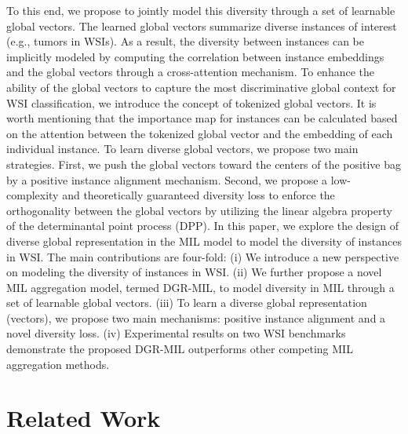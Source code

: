 \documentclass[runningheads]{llncs}
\begin{document}
\indent To this end, we propose to jointly model this diversity through a set of learnable global vectors. The learned global vectors summarize diverse instances of interest (e.g., tumors in WSIs). As a result, the diversity between instances can be implicitly modeled by computing the correlation between instance embeddings and the global vectors through a cross-attention mechanism. To enhance the ability of the global vectors to capture the most discriminative global context for WSI classification, we introduce the concept of tokenized global vectors. It is worth mentioning that the importance map for instances can be calculated based on the attention between the tokenized global vector and the embedding of each individual instance. To learn diverse global vectors, we propose two main strategies. First, we push the global vectors toward the centers of the positive bag by a positive instance alignment mechanism. Second, we propose a low-complexity and theoretically guaranteed diversity loss to enforce the orthogonality between the global vectors by utilizing the linear algebra property of the determinantal point process (DPP). In this paper, we explore the design of diverse global representation in the MIL model to model the diversity of instances in WSI. The main contributions are four-fold: (i) We introduce a new perspective on modeling the diversity of instances in WSI. (ii) We further propose a novel MIL aggregation model, termed DGR-MIL, to model diversity in MIL through a set of learnable global vectors. (iii) To learn a diverse global representation (vectors), we propose two main mechanisms: positive instance alignment and a novel diversity loss. 
(iv) Experimental results on two WSI benchmarks demonstrate the proposed DGR-MIL outperforms other competing MIL aggregation methods.



\section{Related Work}
\end{document}
